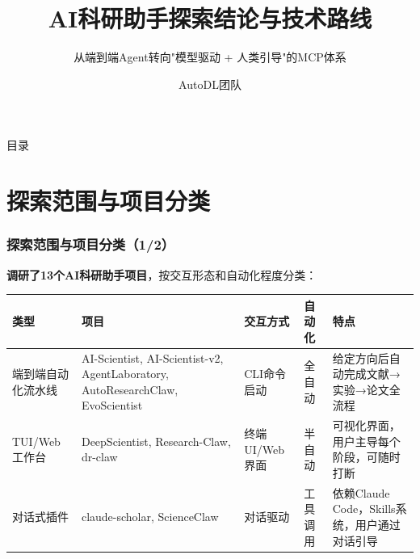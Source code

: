 \documentclass[
  aspectratio=169,
  presentation,
  titlegraphic=./images/bit_logo.pdf,
  framelogo=./images/bit_logo.pdf
]{bitbeamer}
\title{AI科研助手探索结论与技术路线}
\subtitle{从端到端Agent转向"模型驱动 + 人类引导"的MCP体系}
\author{AutoDL团队}
\institute{AutoDL}
\date{\zhtoday}
\begin{document}
\frame{\titlepage}

%
%
\begin{frame}{目录}
  \tableofcontents[hideallsubsections]
\end{frame}


%
\section{探索范围与项目分类}

\begin{frame}[t]
  \frametitle{探索范围与项目分类（1/2）}

  \textbf{调研了13个AI科研助手项目}，按交互形态和自动化程度分类：

  \vspace{0.3cm}

  \begin{table}
    \centering
    \tiny
    \begin{tabular}{p{2.5cm}p{4cm}p{2cm}p{1.5cm}p{3cm}}
      \toprule
      \textbf{类型} & \textbf{项目} & \textbf{交互方式} & \textbf{自动化} & \textbf{特点} \\
      \midrule
      端到端自动化流水线 & AI-Scientist, AI-Scientist-v2, AgentLaboratory, AutoResearchClaw, EvoScientist & CLI命令启动 & 全自动 & 给定方向后自动完成文献→实验→论文全流程 \\
      \midrule
      TUI/Web工作台 & DeepScientist, Research-Claw, dr-claw & 终端UI/Web界面 & 半自动 & 可视化界面，用户主导每个阶段，可随时打断 \\
      \midrule
      对话式插件 & claude-scholar, ScienceClaw & 对话驱动 & 工具调用 & 依赖Claude Code，Skills系统，用户通过对话引导 \\
      \bottomrule
    \end{tabular}
  \end{table}

\end{frame}
\end{document}
